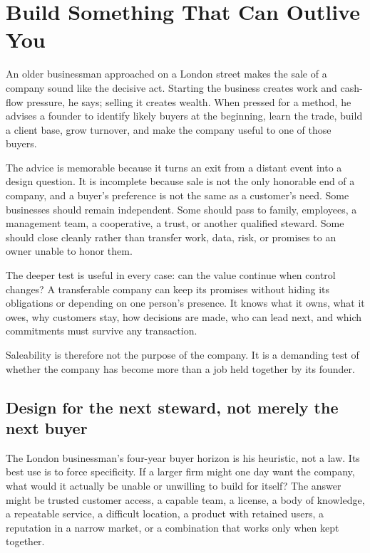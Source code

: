 \chapter{Build Something That Can Outlive You}

An older businessman approached on a London street makes the sale of a company
sound like the decisive act. Starting the business creates work and cash-flow
pressure, he says; selling it creates wealth. When pressed for a method, he
advises a founder to identify likely buyers at the beginning, learn the trade,
build a client base, grow turnover, and make the company useful to one of those
buyers.

The advice is memorable because it turns an exit from a distant event into a
design question. It is incomplete because sale is not the only honorable end of
a company, and a buyer's preference is not the same as a customer's need. Some
businesses should remain independent. Some should pass to family, employees, a
management team, a cooperative, a trust, or another qualified steward. Some
should close cleanly rather than transfer work, data, risk, or promises to an
owner unable to honor them.

The deeper test is useful in every case: can the value continue when control
changes? A transferable company can keep its promises without hiding its
obligations or depending on one person's presence. It knows what it owns, what
it owes, why customers stay, how decisions are made, who can lead next, and
which commitments must survive any transaction.

Saleability is therefore not the purpose of the company. It is a demanding test
of whether the company has become more than a job held together by its founder.

\section{Design for the next steward, not merely the next buyer}

The London businessman's four-year buyer horizon is his heuristic, not a law.
Its best use is to force specificity. If a larger firm might one day want the
company, what would it actually be unable or unwilling to build for itself? The
answer might be trusted customer access, a capable team, a license, a body of
knowledge, a repeatable service, a difficult location, a product with retained
users, a reputation in a narrow market, or a combination that works only when
kept together.

